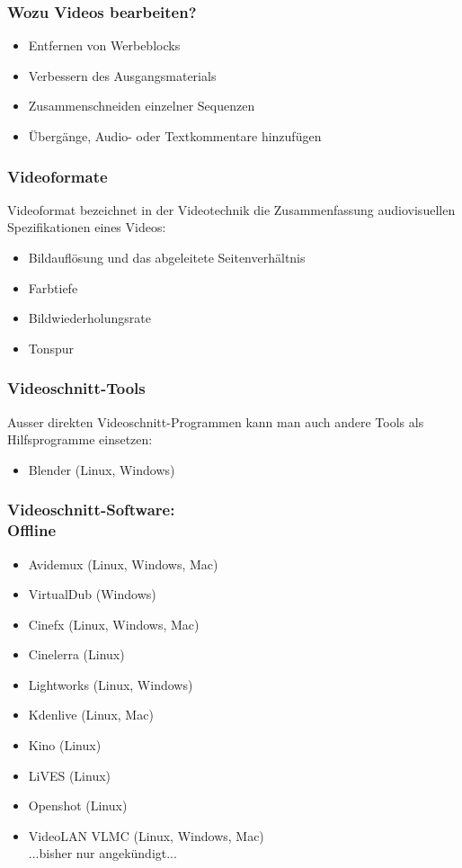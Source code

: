 \begin{frame}

\frametitle{Wozu Videos bearbeiten?}

\pause
  \begin{itemize}
    \item Entfernen von Werbeblocks
    \item Verbessern des Ausgangsmaterials
    \item Zusammenschneiden einzelner Sequenzen
    \item Übergänge, Audio- oder Textkommentare hinzufügen
  \end{itemize}
\end{frame}

\begin{frame}
  \frametitle{Videoformate}
Videoformat bezeichnet in der Videotechnik die Zusammenfassung audiovisuellen Spezifikationen eines Videos:\pause
  \begin{itemize}
    \item Bildauflösung und das abgeleitete Seitenverhältnis
    \item Farbtiefe
    \item Bildwiederholungsrate
    \item Tonspur
  \end{itemize}
\end{frame}

\begin{frame}
\frametitle{Videoschnitt-Tools}
Ausser direkten Videoschnitt-Programmen kann man auch andere Tools als Hilfsprogramme einsetzen:\pause
  \begin{itemize}
    \item Blender (Linux, Windows)
  \end{itemize}
\end{frame}

\begin{frame}
  \frametitle{Videoschnitt-Software:\\Offline}
  \pause
  \begin{itemize}
    \item Avidemux (Linux, Windows, Mac)
    \item VirtualDub (Windows)
    \item Cinefx (Linux, Windows, Mac)
    \item Cinelerra (Linux)
    \item Lightworks (Linux, Windows)
    \item Kdenlive (Linux, Mac)
    \item Kino (Linux)
    \item LiVES (Linux)
    \item Openshot (Linux)
    \item VideoLAN VLMC (Linux, Windows, Mac)\\...bisher nur angekündigt...
  \end{itemize}
\end{frame}

